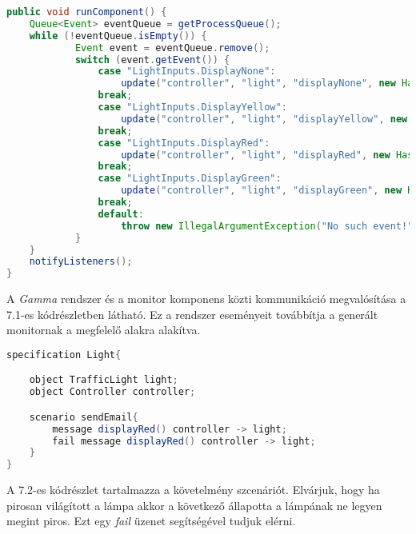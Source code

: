 \begin{lstlisting}[language=java, frame=single, float=ht!, caption={Monitor komponenshez tartozó kódrészlet.},captionpos=b]
public void runComponent() {
    Queue<Event> eventQueue = getProcessQueue();
    while (!eventQueue.isEmpty()) {
            Event event = eventQueue.remove();
            switch (event.getEvent()) {
                case "LightInputs.DisplayNone":
                    update("controller", "light", "displayNone", new HashMap<String, Object>());
                break;
                case "LightInputs.DisplayYellow":
                    update("controller", "light", "displayYellow", new HashMap<String, Object>());
                break;
                case "LightInputs.DisplayRed":
                    update("controller", "light", "displayRed", new HashMap<String, Object>());
                break;
                case "LightInputs.DisplayGreen":
                    update("controller", "light", "displayGreen", new HashMap<String, Object>());
                break;
                default:
                    throw new IllegalArgumentException("No such event!");
            }
    }
    notifyListeners();
}
\end{lstlisting}

A \textit{Gamma} rendszer és a monitor komponens közti kommunikáció megvalósítása a 7.1-es kódrészletben látható.
Ez a rendszer eseményeit továbbítja a generált monitornak a megfelelő alakra alakítva.

\begin{lstlisting}[language=java, frame=single, float=ht!, caption={Szenárió szöveges leírása.},captionpos=b]
specification Light{

    object TrafficLight light;
    object Controller controller;

    scenario sendEmail{
        message displayRed() controller -> light;
        fail message displayRed() controller -> light;
    }
}
\end{lstlisting}

A 7.2-es kódrészlet tartalmazza a követelmény szcenáriót.
Elvárjuk, hogy ha pirosan világított a lámpa akkor a következő állapotta a lámpának ne legyen megint piros.
Ezt egy \textit{fail} üzenet segítségével tudjuk elérni.

